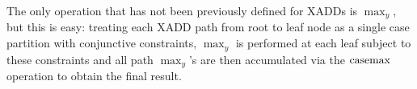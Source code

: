 The only operation that has not been previously defined for XADDs is
$\max_y$, but this is easy: treating each XADD path from root to
leaf node as a single case partition with conjunctive constraints, 
$\max_y$ is performed at each leaf subject to these constraints
and all path $\max_y$'s are then accumulated via the $\mathrm{casemax}$
operation to obtain the final result.

